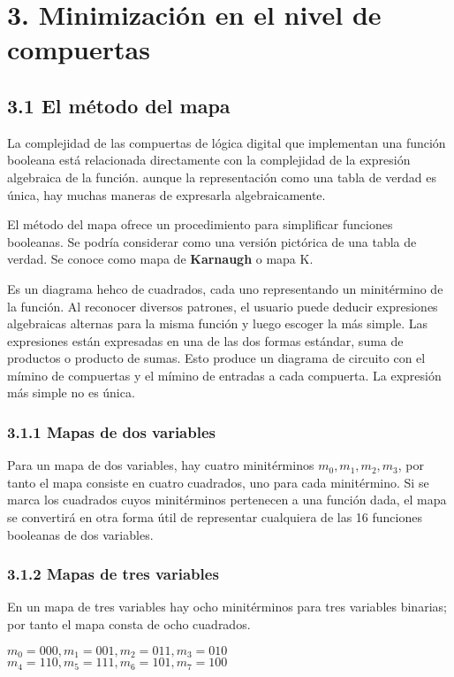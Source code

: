 \newpage
\section*{3. Minimizaci\'{o}n en el nivel de compuertas}
\subsection*{3.1 El m\'{e}todo del mapa}
La complejidad de las compuertas de l\'{o}gica digital que implementan una
funci\'{o}n booleana est\'{a} relacionada directamente con la complejidad de la
expresi\'{o}n algebraica de la funci\'{o}n. aunque la representaci\'{o}n como
una tabla de verdad es \'{u}nica, hay muchas maneras de expresarla
algebraicamente.

El m\'{e}todo del mapa ofrece un procedimiento para simplificar funciones
booleanas. Se podr\'{i}a considerar como una versi\'{o}n pict\'{o}rica de una
tabla de verdad. Se conoce como mapa de \textbf{Karnaugh} o mapa K.

Es un diagrama hehco de cuadrados, cada uno representando un minit\'{e}rmino de
la funci\'{o}n. Al reconocer diversos patrones, el usuario puede deducir
expresiones algebraicas alternas para la misma funci\'{o}n y luego escoger la
m\'{a}s simple. Las expresiones est\'{a}n expresadas en una de las dos formas
est\'{a}ndar, suma de productos o producto de sumas. Esto produce un diagrama de
circuito con el m\'{i}mino de compuertas y el m\'{i}mino de entradas a cada
compuerta. La expresi\'{o}n m\'{a}s simple no es \'{u}nica.

\subsubsection*{3.1.1 Mapas de dos variables}
Para un mapa de dos variables, hay cuatro minit\'{e}rminos $m_0, m_1, m_2, m_3$,
por tanto el mapa consiste en cuatro cuadrados, uno para cada minit\'{e}rmino.
Si se marca los cuadrados cuyos minit\'{e}rminos pertenecen a una funci\'{o}n dada,
el mapa se convertir\'{a} en otra forma \'{u}til de representar cualquiera de las 16
funciones booleanas de dos variables.

\subsubsection*{3.1.2 Mapas de tres variables}
En un mapa de tres variables hay ocho minit\'{e}rminos para tres variables binarias;
por tanto el mapa consta de ocho cuadrados.
\begin{center}
    $m_0 = 000, m_1 = 001, m_2 = 011, m_3 = 010$ \\
    $m_4 = 110, m_5 = 111, m_6 = 101, m_7 = 100$
\end{center}

